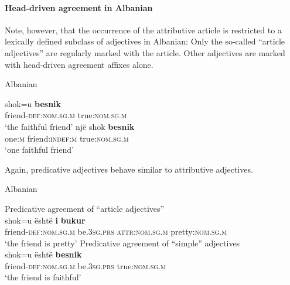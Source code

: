 \paragraph{Head-driven agreement in Albanian}
Note, however, that the occurrence of the attributive article is restricted to a lexically defined subclass of adjectives in Albanian: Only the so-called “article adjectives” are regularly marked with the article. Other adjectives are marked with head-driven agreement affixes alone.
\begin{exe}
\ex \rm{Albanian \citep[examples from][167]{himmelmann1997}}
\begin{xlist}
\ex
\gll	shok=u					\textbf{besnik}\\
	friend-\textsc{def:nom.sg.m} 	true:\textsc{nom.sg.m}\\
\glt	‘the faithful friend’
\ex
\gll 	nj\"e			shok					\textbf{besnik}\\
	one:\textsc{m}	friend:\textsc{indef:m} 	true:\textsc{nom.sg.m}\\
\glt	‘one faithful friend’
\end{xlist}
\end{exe}
Again, predicative adjectives behave similar to attributive adjectives.
\begin{exe}
\ex \rm{Albanian \citep{demiraj1998}}\\
\begin{xlist}
\ex \rm{Predicative agreement of “article adjectives”}\\
\gll	shok=u \"esht\"e \textbf{i} \textbf{bukur}\\
	friend-\textsc{def:nom.sg.m} be\textsc{.3sg.prs} \textsc{attr:nom.sg.m} pretty:\textsc{nom.sg.m}\\
\glt	‘the friend is pretty’
\ex \rm{Predicative agreement of “simple” adjectives}\\
\gll	shok=u \"esht\"e \textbf{besnik}\\
	friend-\textsc{def:nom.sg.m} be\textsc{.3sg.prs} true:\textsc{nom.sg.m}\\
\glt	‘the friend is faithful’
\end{xlist}
\end{exe}

